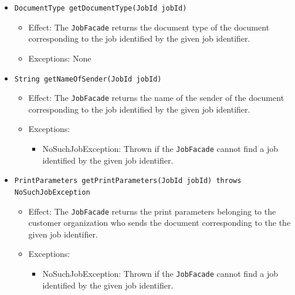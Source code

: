 \documentclass[a4paper,10pt]{article}
\begin{document}
\begin{itemize}
\begin{itemize}
         \item \texttt{DocumentType getDocumentType(JobId jobId)}
        \begin{itemize}
            \item Effect: The \texttt{JobFacade} returns the document type of the document corresponding to the job identified by the given job identifier.
            \item Exceptions: None
        \end{itemize}
        
        \item \texttt{String getNameOfSender(JobId jobId)}    
        \begin{itemize}
            \item Effect: The \texttt{JobFacade} returns the name of the sender of the document corresponding to the job identified by the given job identifier.
            \item Exceptions:
            \begin{itemize}
            	\item NoSuchJobException: Thrown if the \texttt{JobFacade} cannot find a job identified by the given job identifier.
            \end{itemize}
        \end{itemize}        

        \item \texttt{PrintParameters getPrintParameters(JobId jobId) throws NoSuchJobException}    
        \begin{itemize}
            \item Effect: The \texttt{JobFacade} returns the print parameters belonging to the customer organization who sends the document corresponding to the the given job identifier.
            \item Exceptions:
            \begin{itemize}
            	\item NoSuchJobException: Thrown if the \texttt{JobFacade} cannot find a job identified by the given job identifier.
            \end{itemize}
        \end{itemize}        
        
    \end{itemize}  
    

\end{itemize}
\end{document}
